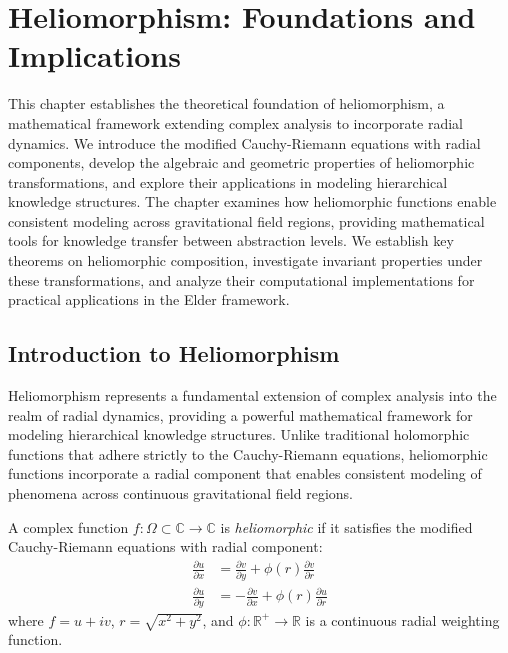 \chapter{Heliomorphism: Foundations and Implications}

\begin{tcolorbox}[colback=blue!5!white,colframe=blue!75!black,title=Chapter Summary]
This chapter establishes the theoretical foundation of heliomorphism, a mathematical framework extending complex analysis to incorporate radial dynamics. We introduce the modified Cauchy-Riemann equations with radial components, develop the algebraic and geometric properties of heliomorphic transformations, and explore their applications in modeling hierarchical knowledge structures. The chapter examines how heliomorphic functions enable consistent modeling across gravitational field regions, providing mathematical tools for knowledge transfer between abstraction levels. We establish key theorems on heliomorphic composition, investigate invariant properties under these transformations, and analyze their computational implementations for practical applications in the Elder framework.
\end{tcolorbox}

\section{Introduction to Heliomorphism}

Heliomorphism represents a fundamental extension of complex analysis into the realm of radial dynamics, providing a powerful mathematical framework for modeling hierarchical knowledge structures. Unlike traditional holomorphic functions that adhere strictly to the Cauchy-Riemann equations, heliomorphic functions incorporate a radial component that enables consistent modeling of phenomena across continuous gravitational field regions.

\begin{definition}
A complex function $f: \Omega \subset \mathbb{C} \rightarrow \mathbb{C}$ is \textit{heliomorphic} if it satisfies the modified Cauchy-Riemann equations with radial component:
\begin{align}
\frac{\partial u}{\partial x} &= \frac{\partial v}{\partial y} + \phi(r)\frac{\partial v}{\partial r} \\
\frac{\partial u}{\partial y} &= -\frac{\partial v}{\partial x} + \phi(r)\frac{\partial u}{\partial r}
\end{align}
where $f = u + iv$, $r = \sqrt{x^2 + y^2}$, and $\phi: \mathbb{R}^+ \rightarrow \mathbb{R}$ is a continuous radial weighting function.
\end{definition}

